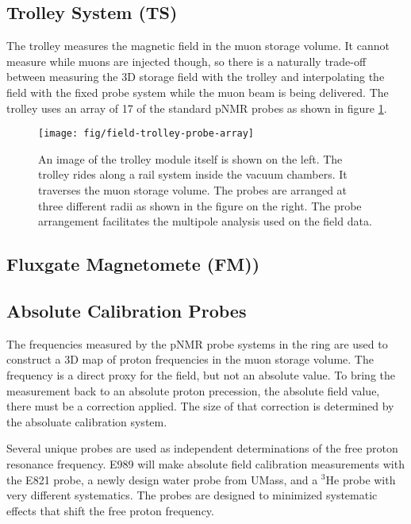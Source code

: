 
\subsection{Trolley System (TS)}

The trolley measures the magnetic field in the muon storage volume.  It cannot measure while muons are injected though, so there is a naturally trade-off between measuring the 3D storage field with the trolley and interpolating the field with the fixed probe system while the muon beam is being delivered.  The trolley uses an array of 17 of the standard pNMR probes as shown in figure \ref{fig:field-trolley-probe-array}.

\begin{figure}
\label{fig:field-trolley-probe-array}
\texttt{[image: fig/field-trolley-probe-array]}
\caption{An image of the trolley module itself is shown on the left.  The trolley rides along a rail system inside the vacuum chambers.  It traverses the muon storage volume.  The probes are arranged at three different radii as shown in the figure on the right.  The probe arrangement facilitates the multipole analysis used on the field data.}
\end{figure}

\subsection{Fluxgate Magnetomete (FM))}


\subsection{Absolute Calibration Probes}

The frequencies measured by the pNMR probe systems in the ring are used to construct a 3D map of proton frequencies in the muon storage volume.  The frequency is a direct proxy for the field, but not an absolute value.  To bring the measurement back to an absolute proton precession, the absolute field value, there must be a correction applied.  The size of that correction is determined by the absoluate calibration system.

Several unique probes are used as independent determinations of the free proton resonance frequency.  E989 will make absolute field calibration measurements with the E821 probe, a newly design water probe from UMass, and a $\mathrm{^3He}$ probe with very different systematics. The probes are designed to minimized systematic effects that shift the free proton frequency.

